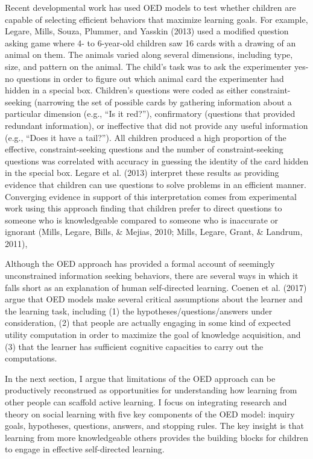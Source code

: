 \documentclass[english,floatsintext,man]{apa6}
\theoremstyle{definition}
\theoremstyle{definition}
\theoremstyle{definition}
\theoremstyle{remark}
\begin{document}
Recent developmental work has used OED models to test whether children
are capable of selecting efficient behaviors that maximize learning
goals. For example, Legare, Mills, Souza, Plummer, and Yasskin (2013)
used a modified question asking game where 4- to 6-year-old children saw
16 cards with a drawing of an animal on them. The animals varied along
several dimensions, including type, size, and pattern on the animal. The
child's task was to ask the experimenter yes-no questions in order to
figure out which animal card the experimenter had hidden in a special
box. Children's questions were coded as either constraint-seeking
(narrowing the set of possible cards by gathering information about a
particular dimension (e.g., \enquote{Is it red?}), confirmatory
(questions that provided redundant information), or ineffective that did
not provide any useful information (e.g., \enquote{Does it have a
tail?}). All children produced a high proportion of the effective,
constraint-seeking questions and the number of constraint-seeking
questions was correlated with accuracy in guessing the identity of the
card hidden in the special box. Legare et al. (2013) interpret these
results as providing evidence that children can use questions to solve
problems in an efficient manner. Converging evidence in support of this
interpretation comes from experimental work using this approach finding
that children prefer to direct questions to someone who is knowledgeable
compared to someone who is inaccurate or ignorant (Mills, Legare, Bills,
\& Mejias, 2010; Mills, Legare, Grant, \& Landrum, 2011),

Although the OED approach has provided a formal account of seemingly
unconstrained information seeking behaviors, there are several ways in
which it falls short as an explanation of human self-directed learning.
Coenen et al. (2017) argue that OED models make several critical
assumptions about the learner and the learning task, including (1) the
hypotheses/questions/answers under consideration, (2) that people are
actually engaging in some kind of expected utility computation in order
to maximize the goal of knowledge acquisition, and (3) that the learner
has sufficient cognitive capacities to carry out the computations.

In the next section, I argue that limitations of the OED approach can be
productively reconstrued as opportunities for understanding how learning
from other people can scaffold active learning. I focus on integrating
research and theory on social learning with five key components of the
OED model: inquiry goals, hypotheses, questions, answers, and stopping
rules. The key insight is that learning from more knowledgeable others
provides the building blocks for children to engage in effective
self-directed learning.
\end{document}
